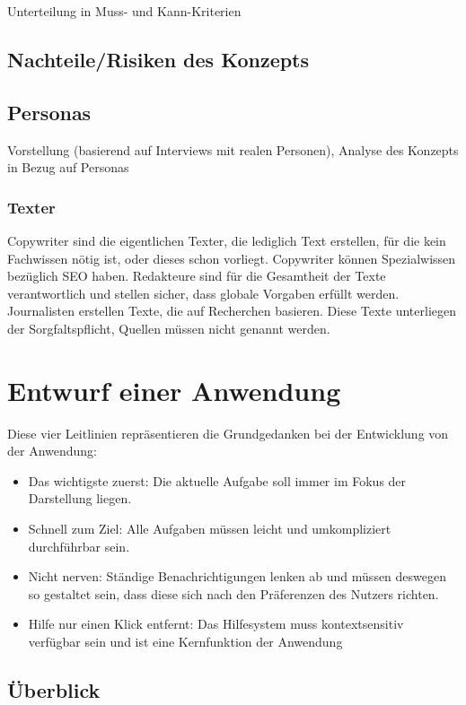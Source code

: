 Unterteilung in Muss- und Kann-Kriterien

\subsection{Nachteile/Risiken des Konzepts}

\subsection{Personas}

Vorstellung (basierend auf Interviews mit realen Personen), Analyse des Konzepts in Bezug auf Personas

\subsubsection{Texter}

Copywriter sind die eigentlichen Texter, die lediglich Text erstellen, für die kein Fachwissen nötig ist, oder dieses schon vorliegt. Copywriter können Spezialwissen bezüglich SEO haben. Redakteure sind für die Gesamtheit der Texte verantwortlich und stellen sicher, dass globale Vorgaben erfüllt werden. Journalisten erstellen Texte, die auf Recherchen basieren. Diese Texte unterliegen der Sorgfaltspflicht, Quellen müssen nicht genannt werden. 

\section{Entwurf einer Anwendung}

Diese vier Leitlinien repräsentieren die Grundgedanken bei der Entwicklung von der Anwendung:

\begin{itemize}
\item{Das wichtigste zuerst: Die aktuelle Aufgabe soll immer im Fokus der Darstellung liegen.}
\item{Schnell zum Ziel: Alle Aufgaben müssen leicht und umkompliziert durchführbar sein.}
\item{Nicht nerven: Ständige Benachrichtigungen lenken ab und müssen deswegen so gestaltet sein, dass diese sich nach den Präferenzen des Nutzers richten.}
\item{Hilfe nur einen Klick entfernt: Das Hilfesystem muss kontextsensitiv verfügbar sein und ist eine Kernfunktion der Anwendung}
\end{itemize}

\subsection{Überblick}

